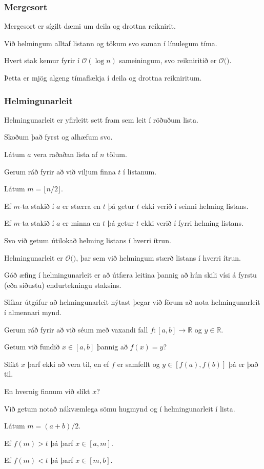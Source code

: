 {
}

{
	\frametitle{Mergesort}
	{
		\item<1-> Mergesort er sígilt dæmi um deila og drottna reiknirit.
		\item<2-> Við helmingum alltaf listann og tökum svo saman í línulegum tíma.
		\item<3-> Hvert stak kemur fyrir í $\mathcal{O}(\log n)$ sameiningum, svo reikniritið er $\mathcal{O}($\onslide<4->{$n \log n$}$)$.
		\item<5-> Þetta er mjög algeng tímaflækja í deila og drottna reikniritum.
	}
}

{
	\frametitle{Helmingunarleit}
	{
		\item<1-> Helmingunarleit er yfirleitt sett fram sem leit í röðuðum lista.
		\item<2-> Skoðum það fyrst og alhæfum svo.
		\item<3-> Látum $a$ vera raðaðan lista af $n$ tölum.
		\item<4-> Gerum ráð fyrir að við viljum finna $t$ í listanum.
		\item<5-> Látum $m = \lfloor n/2 \rfloor$.
		\item<6-> Ef $m$-ta stakið í $a$ er stærra en $t$ þá getur $t$ ekki verið í seinni helming listans.
		\item<7-> Ef $m$-ta stakið í $a$ er minna en $t$ þá getur $t$ ekki verið í fyrri helming listans.
		\item<8-> Svo við getum útilokað helming listans í hverri ítrun.
	}
}

{
}

{
	{
		\item<1-> Helmingunarleit er $\mathcal{O}($$)$, þar sem við helmingum stærð listans í hverri ítrun.
		\item<3-> Góð æfing í helmingunarleit er að útfæra leitina þannig að hún skili vísi á fyrstu (eða síðustu)  endurtekningu staksins.
		\item<4-> Slíkar útgáfur að helmingunarleit nýtast þegar við förum að nota helmingunarleit í almennari mynd.
	}
}

{
	{
		\item<1-> Gerum ráð fyrir að við séum með vaxandi fall $f \colon [a, b] \rightarrow \mathbb{R}$ og $y \in \mathbb{R}$.
		\item<2-> Getum við fundið $x \in [a, b]$ þannig að $f(x) = y$?
		\item<3-> Slíkt $x$ þarf ekki að vera til, en ef $f$ er samfellt og $y \in [f(a), f(b)]$ þá er það til.
		\item<4-> En hvernig finnum við slíkt $x$?
		\item<5-> Við getum notað nákvæmlega sömu hugmynd og í helmingunarleit í lista.
		\item<6-> Látum $m = (a + b)/2$.
		\item<7-> Ef $f(m) > t$ þá þarf $x \in [a, m]$.
		\item<8-> Ef $f(m) < t$ þá þarf $x \in [m, b]$.
	}
}

